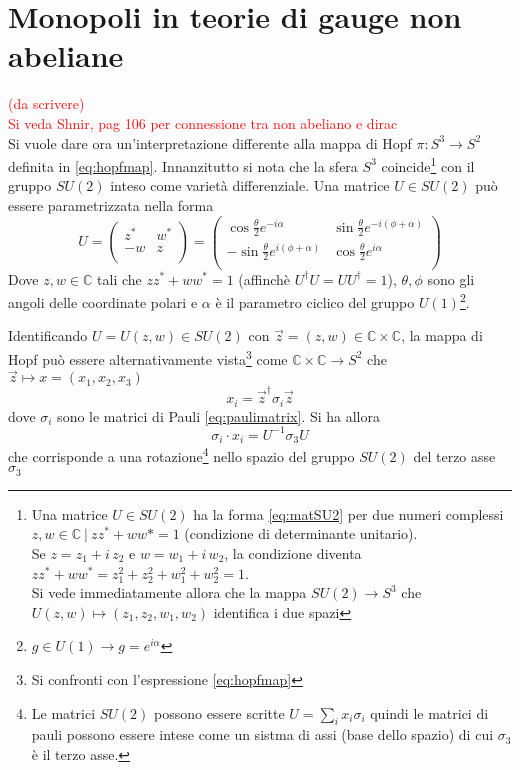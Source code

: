 \chapter{Monopoli in teorie di gauge non abeliane}
\textcolor{red}{(da scrivere)}\\
\textcolor{red}{Si veda Shnir, pag 106 per connessione tra non abeliano e dirac}\\

Si vuole dare ora un'interpretazione differente alla mappa di Hopf $\pi : S^3 \to S^2$
definita in \ref{eq:hopfmap}. Innanzitutto si nota che la sfera $S^3$
coincide\footnote{
   Una matrice $U \in SU(2)$ ha la forma \ref{eq:matSU2} per due numeri complessi
   $z,w \in \mathbb{C} \: | \: zz^* + ww* = 1$ (condizione di determinante unitario).\\
   Se $z = z_1 + i \, z_2$ e $w = w_1 + i \, w_2$, la condizione diventa
   $zz^* + ww^* = z_1^2 + z_2^2 + w_1^2 + w_2^2 = 1$. \\
   Si vede immediatamente allora che la mappa $SU(2) \to S^3$ che
   $U(z,w) \mapsto (z_1,z_2,w_1,w_2)$ identifica i due spazi
}
con il gruppo $SU(2)$ inteso come varietà differenziale. Una matrice $U \in SU(2)$
può essere parametrizzata nella forma
\begin{equation}\label{eq:matSU2}
   U =
        \begin{pmatrix}
          z^* & w^* \\
          -w  & z   \\
        \end{pmatrix}
     =
       \begin{pmatrix}
          \cos \frac{\theta}{2} e^{-i\alpha} & \sin \frac{\theta}{2} e^{-i(\phi + \alpha)} \\
         -\sin \frac{\theta}{2} e^{i(\phi + \alpha)} & \cos \frac{\theta}{2} e^{i\alpha}  \\
       \end{pmatrix}
\end{equation}
Dove $z,w \in \mathbb{C}$ tali che $zz^* + ww^* = 1$
(affinchè $U^\dagger U = UU^\dagger = 1$), $\theta,\phi$ sono gli angoli delle
coordinate polari e $\alpha$ è il parametro ciclico del gruppo $U(1)$\footnote{
   $g \in U(1) \to g = e^{i\alpha}$
}.

Identificando $U = U(z,w) \in SU(2)$ con $\vec z = (z,w) \in \mathbb{C} \times \mathbb{C}$,
la mappa di Hopf può essere alternativamente vista\footnote{
   Si confronti con l'espressione \ref{eq:hopfmap}
}
come $\mathbb{C} \times \mathbb{C} \to S^2$ che $\vec z \mapsto x = (x_1,x_2,x_3)$
$$
   x_i = \vec z ^\dagger \sigma_i \vec z
$$
dove $\sigma_i$ sono le matrici di Pauli \ref{eq:paulimatrix}. Si ha allora
\begin{equation}\label{eq:hopfmap2}
   \sigma_i \cdot x_i = U^{-1} \sigma_3 U
\end{equation}
che corrisponde a una rotazione\footnote{
   Le matrici $SU(2)$ possono essere scritte $U = \sum_i x_i \sigma_i$ quindi le
   matrici di pauli possono essere intese come un sistma di assi (base dello spazio)
   di cui $\sigma_3$ è il terzo asse.
} nello spazio del gruppo $SU(2)$ del terzo asse $\sigma_3$

